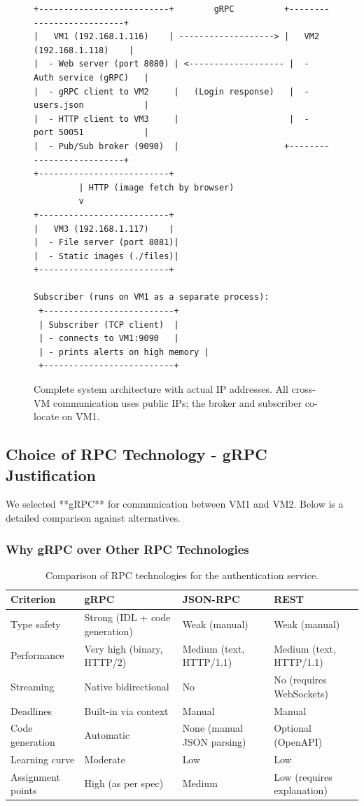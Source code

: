 \documentclass[a4paper]{article}
\begin{document}
\begin{figure}[H]
\centering
\begin{verbatim}
+--------------------------+        gRPC          +--------------------------+
|   VM1 (192.168.1.116)    | -------------------> |   VM2 (192.168.1.118)    |
|  - Web server (port 8080) | <------------------- |  - Auth service (gRPC)   |
|  - gRPC client to VM2     |   (Login response)   |  - users.json            |
|  - HTTP client to VM3     |                      |  - port 50051            |
|  - Pub/Sub broker (9090)  |                     +--------------------------+
+--------------------------+
         | HTTP (image fetch by browser)
         v
+--------------------------+
|   VM3 (192.168.1.117)    |
|  - File server (port 8081)|
|  - Static images (./files)|
+--------------------------+

Subscriber (runs on VM1 as a separate process):
 +--------------------------+
 | Subscriber (TCP client)  |
 | - connects to VM1:9090   |
 | - prints alerts on high memory |
 +--------------------------+
\end{verbatim}
\caption{Complete system architecture with actual IP addresses. All cross-VM communication uses public IPs; the broker and subscriber co-locate on VM1.}
\label{fig:arch_real}
\end{figure}

\subsection{Choice of RPC Technology - gRPC Justification}
We selected **gRPC** for communication between VM1 and VM2. Below is a detailed comparison against alternatives.

\subsubsection{Why gRPC over Other RPC Technologies}
\begin{table}[H]
\centering
\begin{tabular}{|p{3.5cm}|p{3.5cm}|p{3.5cm}|p{3.5cm}|}
\hline
\textbf{Criterion} & \textbf{gRPC} & \textbf{JSON-RPC} & \textbf{REST} \\ \hline
Type safety & Strong (IDL + code generation) & Weak (manual) & Weak (manual) \\ \hline
Performance & Very high (binary, HTTP/2) & Medium (text, HTTP/1.1) & Medium (text, HTTP/1.1) \\ \hline
Streaming & Native bidirectional & No & No (requires WebSockets) \\ \hline
Deadlines & Built-in via context & Manual & Manual \\ \hline
Code generation & Automatic & None (manual JSON parsing) & Optional (OpenAPI) \\ \hline
Learning curve & Moderate & Low & Low \\ \hline
Assignment points & High (as per spec) & Medium & Low (requires explanation) \\ \hline
\end{tabular}
\caption{Comparison of RPC technologies for the authentication service.}
\end{table}
\end{document}
